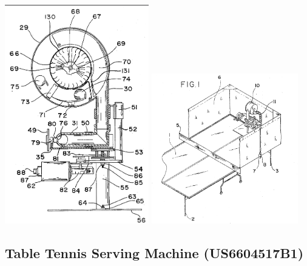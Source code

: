 \documentclass[12pt]{article}
\begin{document}
\begin{minipage}{0.38\textwidth}  %
    \centering
    \includegraphics[width=0.47\textwidth]{figures/patent1-2.png}  %
    \hfill
    \includegraphics[width=0.48\textwidth,height=0.68\textwidth]{figures/patent1-1.png}  %
    \label{fig:pt1-2}
\end{minipage}


\subsection{Table Tennis Serving Machine (US6604517B1) \cite{Chao2003}}
\end{document}
